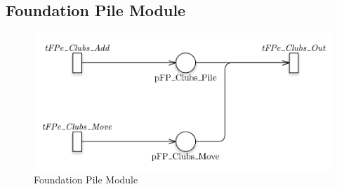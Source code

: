 \documentclass[runningheads,a4paper]{llncs}
\begin{document}
\subsection{Foundation Pile Module}
\begin{figure}
	\begin{center}
		\includegraphics[width=\textwidth]{images/foundationPile}
		\caption{Foundation Pile Module}
	\end{center}
\end{figure}
\end{document}
